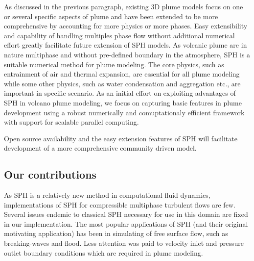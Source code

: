 \documentclass[journal abbreviation, manuscript]{copernicus}
\begin{document}
As discussed in the previous paragraph, existing 3D plume models focus on one or several specific aspects of plume and have been extended to be more comprehensive by accounting for more physics or more phases. Easy extensibility and capability of handling multiples phase flow without additional numerical effort greatly facilitate future extension of SPH models. As volcanic plume are in nature multiphase and without pre-defined boundary in the atmosphere, SPH is a suitable numerical method for plume modeling. The core physics, such as entrainment of air and thermal expansion, are essential for all plume modeling while some other physics, such as water condensation and aggregation etc., are important in specific scenario. As an initial effort on exploiting advantages of SPH in volcano plume modeling, we focus on capturing basic features in plume development using a robust numerically and comuptationaly efficient framework with support for scalable parallel computing. %

Open source availability and  the easy extension features of SPH will facilitate development of a more comprehensive community driven model.

\subsection{Our contributions}
As SPH is a relatively new method in computational fluid dynamics, implementations of SPH for compressible multiphase turbulent flows are few. Several issues endemic to classical SPH necessary for use in this domain are fixed in our implementation. The most popular applications of SPH (and their original motivating application) has been in simulating of free surface flow, such as breaking-waves and flood. Less attention was paid to velocity inlet and pressure outlet boundary conditions which are required in plume modeling.
 
\end{document}
